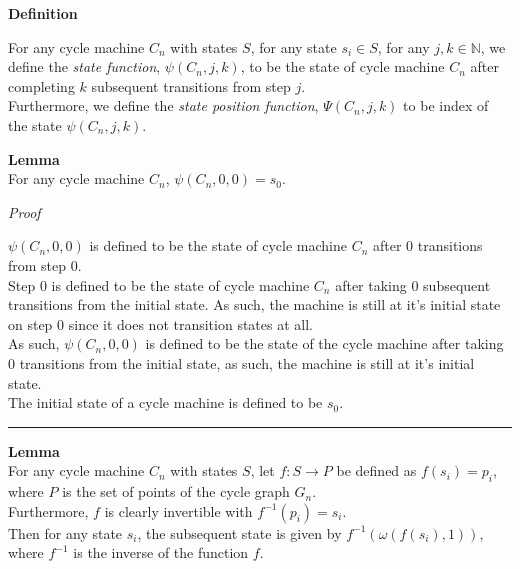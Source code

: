 \documentclass[a4paper,12pt]{article}
\begin{document}
\label{definition:state_function}
\hypertarget{definition:state_function}{}
\begin{tcolorbox}
\textbf{Definition}

\noindent For any cycle machine $C_n$ with states $S$, for any state $s_i \in S$, for any $j, k \in \mathbb{N}$, we define the \textit{state function}, $\psi(C_n, j, k)$, to be the state of cycle machine $C_n$ after completing $k$ subsequent transitions from step $j$.\\

\noindent Furthermore, we define the \textit{state position function}, $\Psi(C_n, j, k)$ to be index of the state $\psi(C_n, j, k)$.
\end{tcolorbox}
\noindent



\begin{tcolorbox}
\textbf{Lemma}\\
For any cycle machine $C_n$, $\psi(C_n, 0, 0) = s_0$.
\end{tcolorbox}

\noindent
\textit{Proof}

\noindent $\psi(C_n, 0, 0)$ is defined to be the state of cycle machine $C_n$ after $0$ transitions from step $0$.\\

\noindent Step $0$ is defined to be the state of cycle machine $C_n$ after taking $0$ subsequent transitions from the initial state. As such, the machine is still at it's initial state on step $0$ since it does not transition states at all.\\

\noindent As such, $\psi(C_n, 0, 0)$ is defined to be the state of the cycle machine after taking $0$ transitions from the initial state, as such, the machine is still at it's initial state.\\

\noindent The initial state of a cycle machine is defined to be $s_0$. 

\begin{center}
\noindent\rule{8cm}{0.4pt}
\end{center}



\begin{tcolorbox}
\textbf{Lemma}\\
For any cycle machine $C_n$ with states $S$, let $f: S \rightarrow P$ be defined as $f(s_i) = p_i$, where $P$ is the set of points of the cycle graph $G_n$.\\

\noindent Furthermore, $f$ is clearly invertible with $f^{-1}(p_i) = s_i$.\\

\noindent Then for any state $s_i$, the subsequent state is given by $f^{-1}(\omega(f(s_i), 1))$, where $f^{-1}$ is the inverse of the function $f$.\\
\end{tcolorbox}
\end{document}
